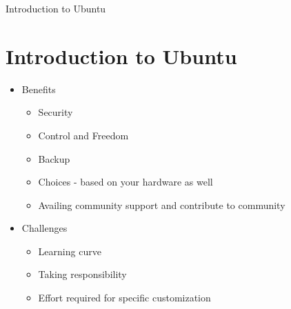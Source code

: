 \documentclass[aspectratio=169,10pt]{beamer}
\begin{document}
    \begin{frame}{Introduction to Ubuntu}
    \section{Introduction to Ubuntu}
       \begin{itemize}
            \item Benefits
            \begin{itemize}
                \item Security
                \item Control and Freedom
                \item Backup
                \item Choices - based on your hardware as well
                \item Availing community support and contribute to community
            \end{itemize}
            \item Challenges
            \begin{itemize}
                 \item Learning curve
                 \item Taking responsibility
                 \item Effort required for specific customization
            \end{itemize}  
        \end{itemize}
    \end{frame}
\end{document}
